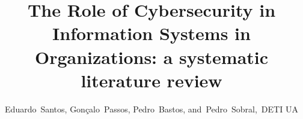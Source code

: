 \documentclass[journal]{IEEEtran}
\begin{document}
%
\title{The Role of Cybersecurity in Information Systems in Organizations: a systematic literature review}
%
%
%


\author{Eduardo~Santos,
        Gonçalo~Passos,
        Pedro~Bastos,
        and~Pedro~Sobral,~DETI UA%
}

% 
%



% 
\end{document}
